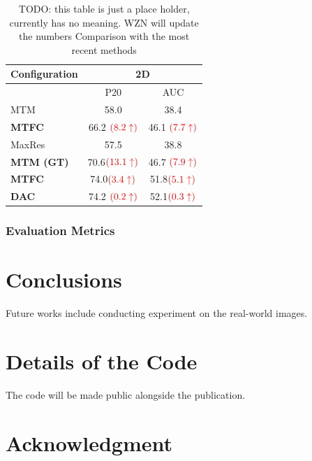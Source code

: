 \documentclass[10pt,twocolumn,letterpaper]{article}
\begin{document}
\begin{table}[t]
\small
   \centering
        \begin{tabular}{|l|| *{2}{c}|}\hline
            {\small Configuration} & \multicolumn{2}{|c|}{\small 2D}    \\ \hline \hline
                                                  & P20       & AUC   \\ \hline \hline

            {\small MTM }                          &  58.0     &  38.4      \\
            \hline
            {\small \textbf{MTFC} }  &  66.2 ${\color{red}(8.2\uparrow)}$    &  46.1 ${\color{red}(7.7\uparrow)}$  \\
            \hline
            \hline
            {\small MaxRes }                        &  57.5     &  38.8   \\
            \hline
            {\small \textbf{MTM (GT)} }        &  70.6${\color{red}(13.1\uparrow)}$     &  46.7  ${\color{red}(7.9\uparrow)}$   \\
            \hline
            \hline
            {\small \textbf{MTFC}}           &  74.0${\color{red}(3.4\uparrow)}$      &  51.8${\color{red}(5.1\uparrow)}$     \\
            \hline
            {\small \textbf{DAC}}&  74.2 ${\color{red}(0.2\uparrow)}$    &  52.1${\color{red}(0.3\uparrow)}$    \\\hline

        \end{tabular}

    \caption{ {\small
    TODO: this table is just a place holder, currently has no meaning. WZN will update the numbers
          Comparison with the most recent methods }
          } \label{table_baseline2}
\end{table}
\subsubsection{Evaluation Metrics}


\section{Conclusions}

Future works include conducting experiment on the real-world images.

\section*{Details of the Code}
 The code will be made public alongside the publication.

\section*{Acknowledgment}

{\small


}
\end{document}
